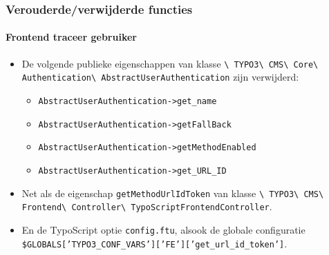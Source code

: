 
\begin{frame}[fragile]
	\frametitle{Verouderde/verwijderde functies}
	\framesubtitle{Frontend traceer gebruiker}

	\begin{itemize}

		\item De volgende publieke eigenschappen van klasse\newline
			\smaller\texttt{\textbackslash
				TYPO3\textbackslash
				CMS\textbackslash
				Core\textbackslash
				Authentication\textbackslash
				AbstractUserAuthentication}
			\normalsize\newline
			zijn verwijderd:

			\begin{itemize}\smaller
				\item \texttt{AbstractUserAuthentication->get\_name}
				\item \texttt{AbstractUserAuthentication->getFallBack}
				\item \texttt{AbstractUserAuthentication->getMethodEnabled}
				\item \texttt{AbstractUserAuthentication->get\_URL\_ID}
			\end{itemize}\normalsize

		\item Net als de eigenschap \texttt{getMethodUrlIdToken} van klasse\newline
			\smaller\texttt{\textbackslash
				TYPO3\textbackslash
				CMS\textbackslash
				Frontend\textbackslash
				Controller\textbackslash
				TypoScriptFrontendController}.
			\normalsize

		\item En de TypoScript optie \texttt{config.ftu},
			alsook de globale configuratie
			{\fontsize{8}{8} \selectfont \texttt{\$GLOBALS['TYPO3\_CONF\_VARS']['FE']['get\_url\_id\_token']}.}

	\end{itemize}

\end{frame}


